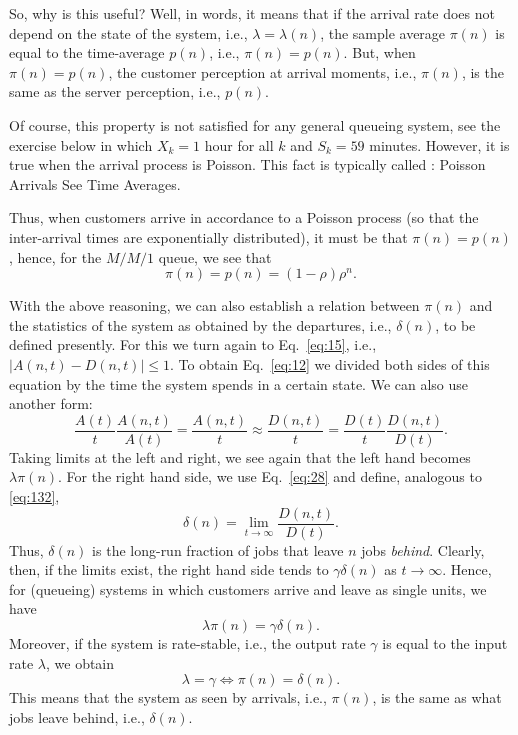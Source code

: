 So, why is this useful? Well, in words, it means that if the arrival
rate does not depend on the state of the system, i.e.,
$\lambda=\lambda(n)$, the sample average $\pi(n)$ is equal to the
time-average $p(n)$, i.e., $\pi(n)=p(n)$. But, when $\pi(n)=p(n)$, the
customer perception at arrival moments, i.e., $\pi(n)$, is the same as
the server perception, i.e., $p(n)$.

Of course, this property is not satisfied for any general queueing
system, see the exercise below in which $X_k=1$ hour for all $k$ and
$S_k=59$ minutes.  However, it is true when the arrival process is
Poisson. This fact is typically called : Poisson
Arrivals See Time Averages.

Thus, when customers arrive in accordance to a Poisson process (so
that the inter-arrival times are exponentially distributed), it must
be that $\pi(n) = p(n)$, hence, for the $M/M/1$ queue, we see that
\begin{equation*}
  \pi(n) = p(n) = (1-\rho)\rho^n.
\end{equation*}


With the above reasoning, we can also establish a relation between
$\pi(n)$ and the statistics of the system as obtained by the
departures, i.e., $\delta(n)$, to be defined presently. For this we
turn again to Eq.~\eqref{eq:15}, i.e., $|A(n,t) - D(n,t)| \leq 1$. To
obtain Eq.~\eqref{eq:12} we divided both sides of this equation by the
time the system spends in a certain state. We can also use another
form:
\begin{equation*}
\frac{A(t)}t \frac{A(n,t)}{A(t)} = \frac{A(n,t)}t \approx \frac{D(n,t)}t 
= \frac{D(t)}t \frac{D(n,t)}{D(t)}.
\end{equation*}
Taking limits at the left and right, we see again that the left hand
becomes $\lambda \pi(n)$. For the right hand side, we use
Eq.~\eqref{eq:28} and define, analogous to \eqref{eq:132}, 
\begin{equation}
  \label{eq:33}
  \delta(n) = \lim_{t\to\infty} \frac{D(n,t)}{D(t)}.
\end{equation}
Thus, $\delta(n)$ is the long-run fraction of jobs that leave $n$ jobs
\emph{behind}. Clearly, then, if the limits exist, the right hand side
tends to $\gamma \delta(n)$ as $t\to\infty$. Hence, for (queueing)
systems in which customers arrive and leave as single units, we have
\begin{equation}
  \label{eq:36}
  \lambda \pi(n) = \gamma \delta(n).
\end{equation}
Moreover, if the system is rate-stable, i.e., the output rate $\gamma$ is equal to the input rate $\lambda$, we obtain
\begin{equation}
  \label{eq:39}
\lambda = \gamma \iff  \pi(n) = \delta(n).
\end{equation}
This means that the system as seen by arrivals, i.e., $\pi(n)$, is
the same as what jobs leave behind, i.e., $\delta(n)$.

